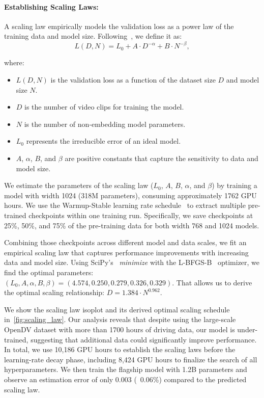 \paragraph{Establishing Scaling Laws:} 
A scaling law empirically models the validation loss as a power law of the training data and model size. Following~\cite{hoffmann2022chinchilla}, we define it as:
%
\begin{equation}
     L(D, N) = L_0 + A \cdot D^{-\alpha} + B \cdot N^{-\beta},
\end{equation}
%

where:
\begin{itemize}
    \item $L(D, N)$ is the validation loss as a function of the dataset size $D$ and model size $N$.
    \item $D$ is the number of video clips for training the model.
    \item $N$ is the number of non-embedding model parameters.
    \item $L_0$ represents the irreducible error of an ideal model.
    \item $A$, $\alpha$, $B$, and $\beta$ are positive constants that capture the sensitivity to data and model size.
\end{itemize}


%
We estimate the parameters of the scaling law ($L_0$, $A$, $B$, $\alpha$, and $\beta$) by training a model with width 1024 (318M parameters), consuming approximately 1762 GPU hours. We use the Warmup-Stable learning rate schedule~\cite{hu2024minicpm} to extract multiple pre-trained checkpoints within one training run. Specifically, we save checkpoints at 25\%, 50\%, and 75\% of the pre-training data for both width 768 and 1024 models.

Combining those checkpoints across different model and data scales, we fit an empirical scaling law that captures performance improvements with increasing data and model size. Using SciPy's~\cite{virtanen2020scipy} \emph{minimize} with the L-BFGS-B~\cite{nocedal1980LBFGS,zhu1997LBFGSB} optimizer, we find the optimal parameters: $(L_0, A, \alpha, B, \beta) = (4.574, 0.250, 0.279, 0.326, 0.329)$. That allows us to derive the optimal scaling relationship: $D = 1.384 \cdot N^{0.962}$. 


We show the scaling law isoplot and its derived optimal scaling schedule in~\autoref{fig:scaling_law}. Our analysis reveals that despite using the large-scale OpenDV dataset \citep{yang2024opendv} with more than 1700 hours of driving data, our model is under-trained, suggesting that additional data could significantly improve performance. 
%
In total, we use 10,186 GPU hours to establish the scaling laws before the learning-rate decay phase, including 8,424 GPU hours to finalize the search of all hyperparameters. We then train the flagship model with 1.2B parameters and observe an estimation error of only 0.003 (~0.06\%) compared to the predicted scaling law.



